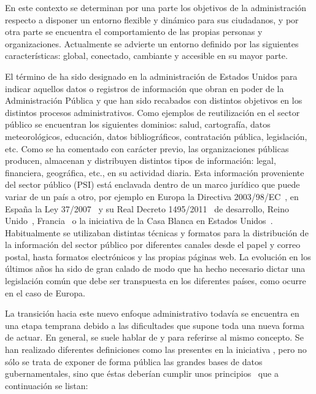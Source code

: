 En este contexto se determinan por una parte los objetivos de la administración
respecto a disponer un entorno flexible y dinámico para sus ciudadanos, y por otra parte 
se encuentra el comportamiento de las propias personas y organizaciones. Actualmente
se advierte un entorno definido por las siguientes características: 
global, conectado, cambiante y accesible en su mayor parte.

El término de \ogd ha sido designado en la administración de Estados Unidos para indicar
aquellos datos o registros de información que obran en poder de la Administración Pública y que
han sido recabados con distintos objetivos en los distintos procesos administrativos. Como ejemplos
de reutilización en el sector público se encuentran los siguientes dominios: salud, cartografía, datos
meteorológicos, educación, datos bibliográficos, contratación pública, legislación, etc. Como 
se ha comentado con carácter previo, las organizaciones públicas producen, almacenan y distribuyen distintos tipos
de información: legal, financiera, geográfica, etc., en su actividad diaria. Esta información
proveniente del sector público (\gls{PSI}) está enclavada dentro de un marco jurídico que puede variar de un país a otro, 
por ejemplo en Europa la Directiva 2003/98/EC~\cite{d2003,d2003-update}, en España la Ley 37/2007~\cite{l37-2007} y su Real Decreto 1495/2011~\cite{r-1495} 
de desarrollo, Reino Unido~\cite{uk2012}, Francia~\cite{fr2012} o la iniciativa de la Casa Blanca en Estados Unidos~\cite{usa}. 
Habitualmente se utilizaban distintas técnicas y formatos
para la distribución de la información del sector público por diferentes canales desde el papel y correo postal, hasta
formatos electrónicos y las propias páginas web. La evolución en los últimos
años ha sido de gran calado de modo que ha hecho necesario dictar una legislación común que 
debe ser transpuesta en los diferentes países, como ocurre en el caso de Europa.

La transición hacia este nuevo enfoque administrativo todavía se encuentra
en una etapa temprana debido a las dificultades que supone toda una nueva forma de
actuar. En general, se suele hablar de \gd y \pusi para referirse al mismo concepto. Se han realizado diferentes definiciones como las
presentes en la iniciativa \ogd, pero no sólo se trata de exponer de forma pública 
las grandes bases de datos gubernamentales, sino que éstas deberían cumplir 
unos principios~\cite{8-principles} que a continuación se listan:

